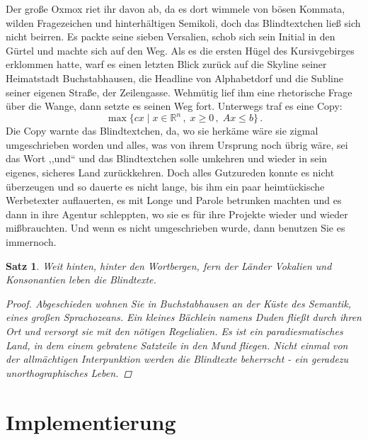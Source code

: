 \documentclass[12pt,a4paper,twoside]{scrartcl}
\newtheorem{Satz}{Satz}[section]
\numberwithin{equation}{section}
\begin{document}
Der große Oxmox riet ihr davon ab, da es dort wimmele von bösen Kommata, wilden Fragezeichen und hinterhältigen Semikoli, doch das Blindtextchen ließ sich nicht beirren. Es packte seine sieben Versalien, schob sich sein Initial in den Gürtel und machte sich auf den Weg. Als es die ersten Hügel des Kursivgebirges erklommen hatte, warf es einen letzten Blick zurück auf die Skyline seiner Heimatstadt Buchstabhausen, die Headline von Alphabetdorf und die Subline seiner eigenen Straße, der Zeilengasse. Wehmütig lief ihm eine rhetorische Frage über die Wange, dann setzte es seinen Weg fort. Unterwegs traf es eine Copy:
$$\max \{ c x \mid x \in \mathbb{R}^n \,,\; x \geq 0 \,,\; A x \leq b \} \,.$$
Die Copy warnte das Blindtextchen, da, wo sie herkäme wäre sie zigmal umgeschrieben worden und alles, was von ihrem Ursprung noch übrig wäre, sei das Wort ,,und`` und das Blindtextchen solle umkehren und wieder in sein eigenes, sicheres Land zurückkehren. Doch alles Gutzureden konnte es nicht überzeugen und so dauerte es nicht lange, bis ihm ein paar heimtückische Werbetexter auflauerten, es mit Longe und Parole betrunken machten und es dann in ihre Agentur schleppten, wo sie es für ihre Projekte wieder und wieder mißbrauchten. Und wenn es nicht umgeschrieben wurde, dann benutzen Sie es immernoch.
\begin{Satz}
Weit hinten, hinter den Wortbergen, fern der Länder Vokalien und Konsonantien leben die Blindtexte.
\begin{proof}
Abgeschieden wohnen Sie in Buchstabhausen an der Küste des Semantik, eines großen Sprachozeans. Ein kleines Bächlein namens Duden fließt durch ihren Ort und versorgt sie mit den nötigen Regelialien. Es ist ein paradiesmatisches Land, in dem einem gebratene Satzteile in den Mund fliegen. Nicht einmal von der allmächtigen Interpunktion werden die Blindtexte beherrscht - ein geradezu unorthographisches Leben.
\end{proof}
\end{Satz}


\section{Implementierung}
\end{document}
